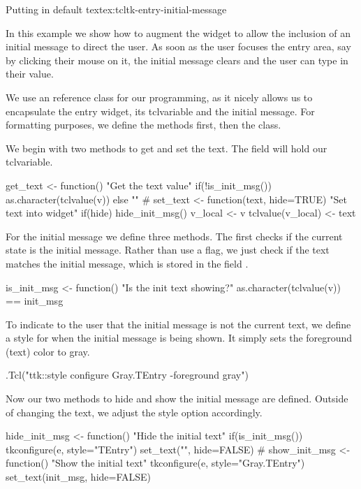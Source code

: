 \begin{example}{Putting in default text}{ex:tcltk-entry-initial-message}

In this example we show how to augment the  widget
to allow the inclusion of an initial message to direct the user. As
soon as the user focuses the entry area, say by clicking their mouse
on it, the initial message clears and the user can type in their value.

We use an \R{} reference class for our programming, as it nicely allows us to
encapsulate the entry widget, its tclvariable and the initial
message. For formatting purposes, we define the methods first, then
the class.

We begin with two methods to get and set the text. The field
 will hold our tclvariable.

\begin{Schunk}
\begin{Sinput}
 get_text <- function() {
   "Get the text value"
   if(!is_init_msg())
     as.character(tclvalue(v))
   else
     ""
 }
 #
 set_text <- function(text, hide=TRUE) {
   "Set text into widget"
   if(hide)
     hide_init_msg()
   v_local <- v
   tclvalue(v_local) <- text
 }
\end{Sinput}
\end{Schunk}

For the initial message we define three methods. The first checks if
the current state is the initial message. Rather than use a flag, we
just check if the text matches the initial message, which is stored in
the field .

\begin{Schunk}
\begin{Sinput}
 is_init_msg <- function() {
   "Is the init text showing?"
   as.character(tclvalue(v)) == init_msg
 }
\end{Sinput}
\end{Schunk}
To indicate to the user that the initial message is not the current
text, we define a style for when the initial message is being
shown. It simply sets the foreground (text) color to gray.

\begin{Schunk}
\begin{Sinput}
 .Tcl("ttk::style configure Gray.TEntry -foreground gray") 
\end{Sinput}
\end{Schunk}

Now our two methods to hide and show the initial message are defined. Outside of
changing the text, we adjust the style option accordingly.
\begin{Schunk}
\begin{Sinput}
 hide_init_msg <- function() {
   "Hide the initial text"
   if(is_init_msg()) {
     tkconfigure(e, style="TEntry")
     set_text("", hide=FALSE)
   }
 }
 #
 show_init_msg <- function() {
   "Show the initial text"
   tkconfigure(e, style="Gray.TEntry")
   set_text(init_msg, hide=FALSE)
 }
\end{Sinput}
\end{Schunk}


\end{example}
